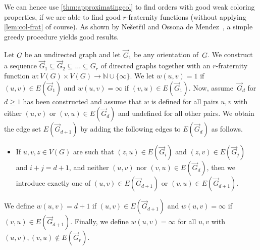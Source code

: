 \documentclass[1p,number,a4paper]{elsarticle}
\theoremstyle{remark}
\newcommand{\N}{\mathbb{N}}
\begin{document}
We can hence use \cref{thm:approximatingcol} to find 
orders with good weak coloring properties, if we are able
to find good $r$-fraternity functions (without applying 
\cref{lem:col-frat} of course). 
As shown by Ne\v{s}et\v{r}il and Ossona de Mendez~\cite{nevsetvril2008grad}, a
simple greedy procedure yields good results. 

Let $G$ be an undirected graph and let $\vec G_1$ be any orientation of~$G$. We construct a sequence $\vec G_1 \subseteq \vec G_2 \subseteq \dots\subseteq G_r$ of
directed graphs together with an $r$-fraternity function 
$w\colon V(G)\times V(G)\rightarrow\N\cup\{\infty\}$. 
We let $w(u,v)=1$ if $(u,v)\in E(\vec G_1)$ and $w(u,v)=\infty$
if $(v,u)\in E(\vec{G}_1)$. Now, assume~$\vec{G}_d$ for 
$d\geq 1$ has been constructed and assume that $w$ is defined
for all pairs $u,v$ with either $(u,v)$ or $(v,u)\in E(\vec{G}_d)$
and undefined for all other pairs.  
We obtain the edge set $E(\vec{G}_{d+1})$ by adding the
following edges to $E(\vec G_d)$ as follows. 

\begin{itemize}
    \item If $u,v,z\in V(G)$ are such that $(z,u) \in E(\vec G_i)$ 
    and $(z,v) \in E(\vec G_j)$ and $i+j=d+1$, and neither 
    $(u,v)$ nor $(v,u)\in E(\vec G_d)$, then we introduce exactly 
    one of $(u,v) \in E(\vec G_{d+1})$ or $(v,u) \in E(\vec G_{d+1})$.
\end{itemize}

We define $w(u,v)=d+1$ if $(u,v) \in E(\vec G_{d+1})$ and 
$w(u,v)=\infty$ if $(v,u) \in E(\vec G_{d+1})$. Finally, 
we define $w(u,v)=\infty$ for all $u,v$ with $(u,v), (v,u)\not\in 
E(\vec{G}_r)$. 
\end{document}
